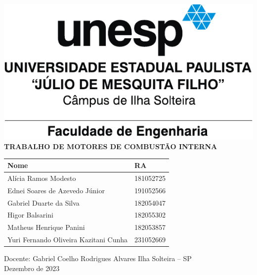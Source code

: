 \documentclass[
    12pt,                %
    brazilian,           %
    a4paper,             %
    openright,             %
    oneside,             %
    chapter=TITLE,       %
]{abntex2}
\renewcommand{\imprimircapa}{%
    \begin{center}\large
    \sffamily
        \includegraphics{./figuras/feis_unesp.pdf}
        \vfill
        {\bfseries \Large TRABALHO DE MOTORES DE COMBUSTÃO INTERNA}
        \vfill
        \begin{tabular}{ll}
            Nome & RA \\ \hline
            Alícia Ramos Modesto                  & 181052725 \\
            Ednei Soares de Azevedo Júnior        & 191052566 \\
            Gabriel Duarte da Silva               & 182054047 \\
            Higor Balsarini                       & 182055302 \\
            Matheus Henrique Panini               & 182053857 \\
            Yuri Fernando Oliveira Kazitani Cunha & 231052669
        \end{tabular}
        \vfill
        Docente: Gabriel Coelho Rodrigues Alvares
        \vfill
        Ilha Solteira -- SP \\
        Dezembro de 2023
    \end{center}
    \clearpage
}
\begin{document}
\imprimircapa\clearpage

\textual






\printbibliography
	
\end{document}
